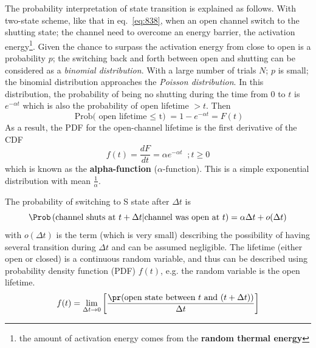 The probability interpretation of state transition is explained as
follows.  With two-state scheme, like that in eq.~\eqref{eq:838}, when
an open channel switch to the shutting state; the channel need to
overcome an energy barrier, the activation
energy\footnote{the amount of activation energy comes from the
  {\bf random thermal energy}}.  Given the chance to surpass the
activation energy from close to open is a probability $p$; the
switching back and forth between open and shutting can be considered
as a {\it binomial distribution}. With a large number of trials $N$;
$p$ is small; the binomial distribution approaches the
{\it Poisson distribution}. In this distribution, the probability of
being no shutting during the time from 0 to $t$ is $e^{-\alpha t}$
which is also the probability of open lifetime $> t$. Then
\begin{equation}
  \label{eq:848}
  \text{Prob( open lifetime $\le$ t)} = 1- e^{-\alpha t} = F(t)
\end{equation}
As a result, the PDF for the open-channel lifetime is the first
derivative of the CDF
\begin{equation}
  \label{eq:849}
  f(t) = \frac{dF}{dt} = \alpha e^{-\alpha t} \;\; ; t\ge 0
\end{equation}
which is known as the {\bf alpha-function} ($\alpha$-function). This
is a simple exponential distribution with mean
$\frac{1}{\alpha}$. %

The probability of switching to S state after $\Delta t$ is
\begin{equation}
\label{eq:dwell_01}
\Prob \left( \text{channel shuts at $t+\Delta t$} | \text{channel
was open at $t$} \right) = \alpha \Delta t + o(\Delta t)
\end{equation}
with $o(\Delta t)$ is the term (which is very small) describing the
possibility of having several transition during $\Delta t$ and can be assumed
negligible. The lifetime (either open or closed) is a continuous random
variable, and thus can be described using probability density function (PDF)
$f(t)$, e.g. the random variable is the open lifetime.
\begin{equation}
  \label{eq:889}
  f(t) = \lim_{\Delta t\rightarrow 0}\left[\frac{\pr(\text{open state  between
        $t$ and $(t+\Delta t)$})}{\Delta t}\right]
\end{equation}


